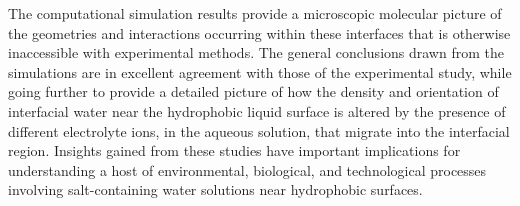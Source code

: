 The computational simulation results provide a microscopic molecular picture of the geometries and interactions occurring within these interfaces that is otherwise inaccessible with experimental methods. The general conclusions drawn from the simulations are in excellent agreement with those of the experimental study, while going further to provide a detailed picture of how the density and orientation of interfacial water near the hydrophobic liquid surface is altered by the presence of different electrolyte ions, in the aqueous solution, that migrate into the interfacial region. Insights gained from these studies have important implications for understanding a host of environmental, biological, and technological processes involving salt-containing water solutions near hydrophobic surfaces.


